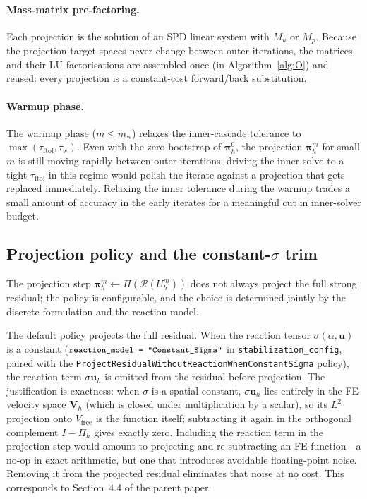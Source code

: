 \documentclass{article}
\newcommand{\code}[1]{\texttt{\small #1}}
\newcommand{\textftol}{\tau_{\mathrm{ftol}}}
\begin{document}
\paragraph{Mass-matrix pre-factoring.}  Each projection is the solution
of an SPD linear system with $M_u$ or $M_p$. Because the projection
target spaces never change between outer iterations, the matrices and
their LU factorisations are assembled once (in Algorithm~\ref{alg:O})
and reused: every projection is a constant-cost forward/back
substitution.

\paragraph{Warmup phase.}  The warmup phase ($m \le m_{\mathrm{w}}$)
relaxes the inner-cascade tolerance to $\max(\textftol, \tau_{\mathrm{w}})$.
Even with the zero bootstrap of $\boldsymbol{\pi}_h^0$, the projection
$\boldsymbol{\pi}_h^{m}$ for small $m$ is still moving rapidly between
outer iterations; driving the inner solve to a tight $\textftol$ in this
regime would polish the iterate against a projection that gets replaced
immediately. Relaxing the inner tolerance during the warmup trades a
small amount of accuracy in the early iterates for a meaningful cut in
inner-solver budget.

\subsection{Projection policy and the constant-$\sigma$ trim}
\label{sec:proj-policy}

The projection step
$\boldsymbol{\pi}_h^{m} \gets \Pi(\mathcal{R}(U_h^m))$ does not always
project the full strong residual; the policy is configurable, and the
choice is determined jointly by the discrete formulation and the
reaction model.

The default policy projects the full residual. When the reaction
tensor $\sigma(\alpha, \boldsymbol{u})$ is a constant
($\code{reaction\_model = "Constant\_Sigma"}$ in
\code{stabilization\_config}, paired with the
\code{ProjectResidualWithoutReactionWhenConstantSigma} policy), the
reaction term $\sigma \boldsymbol{u}_h$ is omitted from the residual
before projection. The justification is exactness: when $\sigma$ is a
spatial constant, $\sigma \boldsymbol{u}_h$ lies entirely in the FE
velocity space $\boldsymbol{V}_h$ (which is closed under multiplication
by a scalar), so its $L^2$ projection onto $V_{\mathrm{free}}$ is the
function itself; subtracting it again in the orthogonal complement
$I - \Pi_h$ gives exactly zero. Including the reaction term in the
projection step would amount to projecting and re-subtracting an FE
function---a no-op in exact arithmetic, but one that introduces avoidable
floating-point noise. Removing it from the projected residual eliminates
that noise at no cost. This corresponds to Section~4.4 of the parent
paper.
\end{document}
